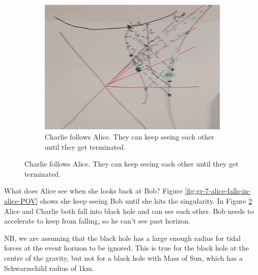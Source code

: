 \documentclass[]{article}
\begin{document}
{\begin{figure}[H]
\begin{subfigure}{0.3\textwidth}
	 \end{subfigure}
  	\begin{subfigure}{0.3\textwidth}
	 	\caption{Charlie follows Alice. They can keep seeing each other until they get terminated.}\label{fig:gr-7-alice-bob-charlie}
	 	\includegraphics[width=\textwidth]{gr-7-alice-bob-charlie}
	 \end{subfigure}
 \end{figure}



What does Alice see when she looks back at Bob? Figure \ref{fig:gr-7-alice-falls-in-alice-POV} shows she keep seeing Bob until she hits the singularity. In Figure \ref{fig:gr-7-alice-bob-charlie} Alice and Charlie both fall into black hole and can see each other. Bob needs to accelerate to keep from falling, so he can't see past horizon.

NB, we are assuming that the black hole has a large enough radius for tidal forces at the event horizon to be ignored. This is true for the black hole at the centre of the gravity, but not for a black hole with Mass of Sun, which has a Schwarzschild radius of 1km.


}
\end{document}
